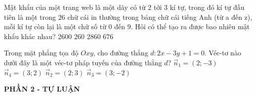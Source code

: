 \begin{ex}%
	Mật khẩu của một trang web là một dãy có từ $2$ tới $3$ kí tự, trong đó kí tự đầu tiên là một trong $26$ chữ cái in thường trong bảng chữ cái tiếng Anh (từ a đến z), mỗi kí tự còn lại là một chữ số từ $0$ đến $9$. Hỏi có thể tạo ra được bao nhiêu mật khẩu khác nhau?
	\choice
	{\True $2600$}
	{$260$}
	{$2860$}
	{$676$}
\end{ex}
\begin{ex}%
	Trong mặt phẳng tọa độ $Oxy$, cho đường thẳng $d\colon 2x-3y+1=0$. Véc-tơ nào dưới đây là một véc-tơ pháp tuyến của đường thẳng $d$?
	\choice
	{\True $\overrightarrow{n}_1=(2;-3)$}
	{$\overrightarrow{n}_4=(3;2)$}
	{$\overrightarrow{n}_2=(2;3)$}
	{$\overrightarrow{n}_3=(3;-2)$}
\end{ex}


\begin{center}
	\textbf{PHẦN 2 - TỰ LUẬN}
\end{center}



